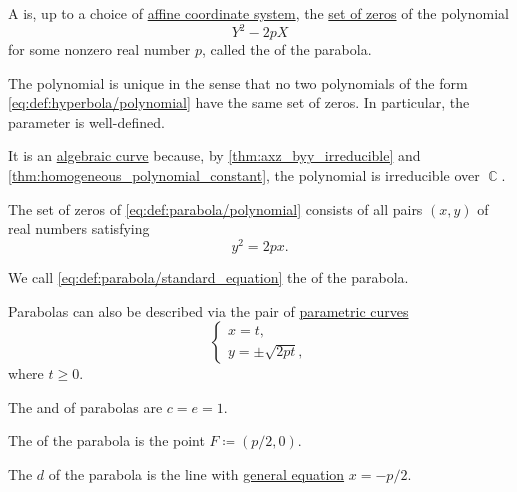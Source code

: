 \begin{definition}\label{def:parabola}
  A  is, up to a choice of \hyperref[def:affine_coordinate_system]{affine coordinate system}, the \hyperref[def:polynomial_root]{set of zeros} of the polynomial
  \begin{equation}\label{eq:def:parabola/polynomial}
    Y^2 - 2p X
  \end{equation}
  for some nonzero real number \( p \), called the  of the parabola.

  The polynomial is unique in the sense that no two polynomials of the form \eqref{eq:def:hyperbola/polynomial} have the same set of zeros. In particular, the parameter is well-defined.

  It is an \hyperref[def:affine_algebraic_set/curve]{algebraic curve} because, by \cref{thm:axz_byy_irreducible} and \cref{thm:homogeneous_polynomial_constant}, the polynomial is irreducible over \( \BbbC \).

  \begin{thmenum}
     The set of zeros of \eqref{eq:def:parabola/polynomial} consists of all pairs \( (x, y) \) of real numbers satisfying
    \begin{equation}\label{eq:def:parabola/standard_equation}
      y^2 = 2px.
    \end{equation}

    We call \eqref{eq:def:parabola/standard_equation} the  of the parabola.

     Parabolas can also be described via the pair of \hyperref[def:parametric_curve]{parametric curves}
    \begin{equation}\label{eq:def:parabola/parametric_equation}
      \begin{cases}
        x = t, \\
        y = \pm \sqrt{ 2pt },
      \end{cases}
    \end{equation}
    where \( t \geq 0 \).

     The  and  of parabolas are \( c = e = 1 \).

     The  of the parabola is the point \( F \coloneqq (p / 2, 0) \).

     The  \( d \) of the parabola is the line with \hyperref[def:plane_line_equations/general]{general equation} \( x = -p / 2 \).


\end{thmenum}
\end{definition}
